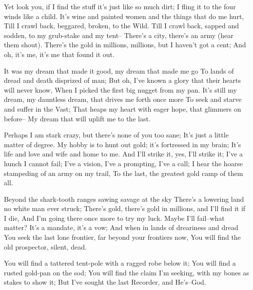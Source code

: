 \begin{poemblock}
 Yet look you, if I find the stuff it's just like so much dirt;
  I fling it to the four winds like a child.
 It's wine and painted women and the things that do me hurt,
  Till I crawl back, beggared, broken, to the Wild.
 Till I crawl back, sapped and sodden, to my grub-stake and my tent--
  There's a city, there's an army (hear them shout).
 There's the gold in millions, millions, but I haven't got a cent;
  And oh, it's me, it's me that found it out.

 It was my dream that made it good, my dream that made me go
  To lands of dread and death disprized of man;
 But oh, I've known a glory that their hearts will never know,
  When I picked the first big nugget from my pan.
 It's still my dream, my dauntless dream, that drives me forth once more
  To seek and starve and suffer in the Vast;
 That heaps my heart with eager hope, that glimmers on before--
  My dream that will uplift me to the last.

 Perhaps I am stark crazy, but there's none of you too sane;
  It's just a little matter of degree.
 My hobby is to hunt out gold; it's fortressed in my brain;
  It's life and love and wife and home to me.
 And I'll strike it, yes, I'll strike it; I've a hunch I cannot fail;
  I've a vision, I've a prompting, I've a call;
 I hear the hoarse stampeding of an army on my trail,
  To the last, the greatest gold camp of them all.

 Beyond the shark-tooth ranges sawing savage at the sky
  There's a lowering land no white man ever struck;
 There's gold, there's gold in millions, and I'll find it if I die,
  And I'm going there once more to try my luck.
 Maybe I'll fail--what matter?  It's a mandate, it's a vow;
  And when in lands of dreariness and dread
 You seek the last lone frontier, far beyond your frontiers now,
  You will find the old prospector, silent, dead.

  You will find a tattered tent-pole with a ragged robe below it;
   You will find a rusted gold-pan on the sod;
  You will find the claim I'm seeking,
with my bones as stakes to show it;
   But I've sought the last Recorder, and He's--God.
\end{poemblock}
